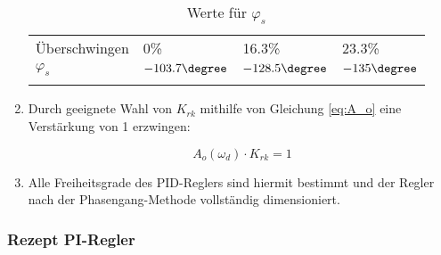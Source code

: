 \begin{enumerate}
\begin{longtable}{llll}

            \"Uberschwingen & 0\%              & 16.3\%           & 23.3\% \\
            $\varphi_s$        & $-103.7 \degree$ & $-128.5 \degree$ & $-135 \degree$ \\

            \bottomrule
            \caption{Werte f\"ur $\varphi_s$}
            \label{tab:phi_s}
        \end{longtable}

    \item
        Durch geeignete Wahl von  $K_{rk}$ mithilfe von Gleichung \ref{eq:A_o}
        eine Verst\"arkung von 1 erzwingen:

        \begin{equation} \label{eq:A_o}
            A_o(\omega_d) \cdot K_{rk} = 1
        \end{equation}

    \item
        Alle  Freiheitsgrade des  PID-Reglers  sind hiermit  bestimmt und  der
        Regler nach der Phasengang-Methode vollst\"andig dimensioniert.
\end{enumerate}



\subsubsection{Rezept PI-Regler}

